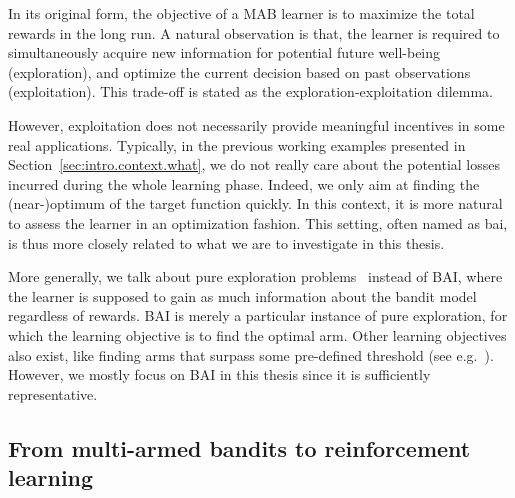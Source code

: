 In its original form, the objective of a MAB learner is to maximize the total rewards in the long run. A natural observation is that, the learner is required to simultaneously acquire new information for potential future well-being (exploration), and optimize the current decision based on past observations (exploitation). This trade-off is stated as the \gls{exploration-exploitation dilemma}. 

However, exploitation does not necessarily provide meaningful incentives in some real applications. Typically, in the previous working examples presented in Section~\ref{sec:intro.context.what}, we do not really care about the potential losses incurred during the whole learning phase. Indeed, we only aim at finding the (near-)optimum of the target function quickly. In this context, it is more natural to assess the learner in an optimization fashion. This setting, often named as \gls{bai}, is thus more closely related to what we are to investigate in this thesis.

\begin{remark}
\begin{leftbar}[remarkbar]
More generally, we talk about \gls{pure exploration} problems~\citep{bubeck2011pure} instead of BAI, where the learner is supposed to gain as much information about the bandit model regardless of rewards. BAI is merely a particular instance of pure exploration, for which the learning objective is to find the optimal arm. Other learning objectives also exist, like finding arms that surpass some pre-defined threshold (see e.g.~\citealt{locatelli2016thresholding}). However, we mostly focus on BAI in this thesis since it is sufficiently representative.
\end{leftbar}
\end{remark}

\subsection{From multi-armed bandits to reinforcement learning}\label{sec:intro.context.rl}

